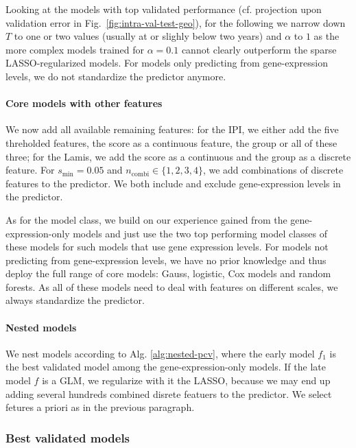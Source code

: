 Looking at the models with top validated performance (cf. projection upon validation error in Fig.\
\ref{fig:intra-val-test-geo}), for the following we narrow down $T$ to one or 
two values (usually at or slighly below two years) and $\alpha$ to $1$ as the more complex models 
trained for $\alpha = \num{0.1}$ cannot clearly outperform the sparse LASSO-regularized models. For 
models only predicting from gene-expression levels, we do not standardize the predictor anymore.

\paragraph{Core models with other features}
We now add all available remaining features: for the 
IPI, we either add the five threholded features, the score as a continuous feature, the group or 
all of these three; for the Lamis, %
we add the score as a continuous and the group as a discrete feature. For $s_\text{min} = \num{0.05}$ 
and $n_\text{combi} \in \{1, 2, 3, 4 \}$, we add combinations of discrete features to the predictor. 
We both include and exclude gene-expression levels in the predictor.

As for the model class, we build on our experience gained from the gene-expression-only models and 
just use the two top performing model classes of these models for such models that use gene 
expression levels. For models not predicting from gene-expression levels, we have no prior 
knowledge and thus deploy the full range of core models: Gauss, logistic, Cox models and random 
forests. As all of these models need to deal with features on different scales, we always 
standardize the predictor.

\paragraph{Nested models}
We nest models according to Alg. \ref{alg:nested-pcv}, where the early model $f_1$ is the best 
validated model among the gene-expression-only models. If the late model $f$ is a GLM,
we regularize with it the LASSO, because we may end up adding several 
hundreds combined disrete featuers to the predictor. We select fetures a priori as in the previous 
paragraph.

\subsubsection{Best validated models}

